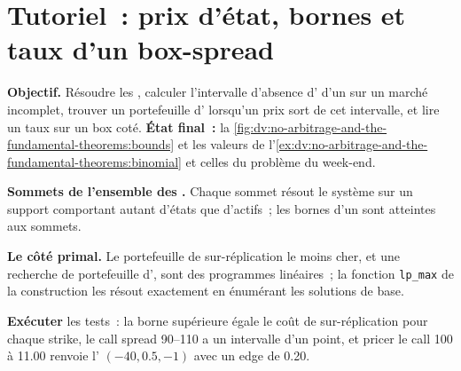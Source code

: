 \section{Tutoriel~: prix d'état, bornes et taux d'un box-spread}\label{tut:dv:no-arbitrage-and-the-fundamental-theorems:tut}

\begin{tutorial}
\textbf{Objectif.} Résoudre les , calculer l'intervalle d'absence d'
d'un  sur un marché incomplet, trouver un portefeuille d' lorsqu'un prix
sort de cet intervalle, et lire un taux sur un box coté. \textbf{État final~:}
la \cref{fig:dv:no-arbitrage-and-the-fundamental-theorems:bounds} et les valeurs de
l'\cref{ex:dv:no-arbitrage-and-the-fundamental-theorems:binomial} et celles du
problème du week-end.
\begin{tutsteps}
\item \textbf{Sommets de l'ensemble des .} Chaque sommet résout le système sur
un support comportant autant d'états que d'actifs~; les bornes d'un  sont
atteintes aux sommets.
\label{lst:dv:no-arbitrage-and-the-fundamental-theorems:vertices}
\item \textbf{Le côté primal.} Le portefeuille de sur-réplication le moins cher, et une
recherche de portefeuille d', sont des programmes linéaires~; la fonction
\texttt{lp\_max} de la construction les résout exactement en énumérant les solutions de base.
\label{lst:dv:no-arbitrage-and-the-fundamental-theorems:lp}
\item \textbf{Exécuter} les tests~: la borne supérieure égale le coût de sur-réplication
pour chaque strike, le call spread 90--110 a un intervalle d'un point, et pricer
le call 100 à 11.00 renvoie l' $(-40, 0.5, -1)$ avec un edge de 0.20.

\end{tutsteps}
\end{tutorial}
